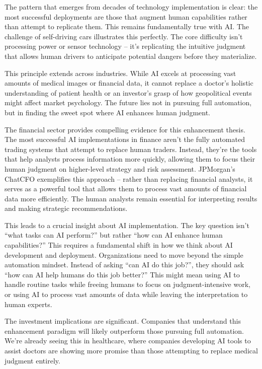 \documentclass[
  Letterpaper,
]{scrbook}
\begin{document}
The pattern that emerges from decades of technology implementation is
clear: the most successful deployments are those that augment human
capabilities rather than attempt to replicate them. This remains
fundamentally true with AI. The challenge of self-driving cars
illustrates this perfectly. The core difficulty isn't processing power
or sensor technology -- it's replicating the intuitive judgment that
allows human drivers to anticipate potential dangers before they
materialize.

This principle extends across industries. While AI excels at processing
vast amounts of medical images or financial data, it cannot replace a
doctor's holistic understanding of patient health or an investor's grasp
of how geopolitical events might affect market psychology. The future
lies not in pursuing full automation, but in finding the sweet spot
where AI enhances human judgment.

The financial sector provides compelling evidence for this enhancement
thesis. The most successful AI implementations in finance aren't the
fully automated trading systems that attempt to replace human traders.
Instead, they're the tools that help analysts process information more
quickly, allowing them to focus their human judgment on higher-level
strategy and risk assessment. JPMorgan's ChatCFO exemplifies this
approach -- rather than replacing financial analysts, it serves as a
powerful tool that allows them to process vast amounts of financial data
more efficiently. The human analysts remain essential for interpreting
results and making strategic recommendations.

This leads to a crucial insight about AI implementation. The key
question isn't ``what tasks can AI perform?'' but rather ``how can AI
enhance human capabilities?'' This requires a fundamental shift in how
we think about AI development and deployment. Organizations need to move
beyond the simple automation mindset. Instead of asking ``can AI do this
job?'', they should ask ``how can AI help humans do this job better?''
This might mean using AI to handle routine tasks while freeing humans to
focus on judgment-intensive work, or using AI to process vast amounts of
data while leaving the interpretation to human experts.

The investment implications are significant. Companies that understand
this enhancement paradigm will likely outperform those pursuing full
automation. We're already seeing this in healthcare, where companies
developing AI tools to assist doctors are showing more promise than
those attempting to replace medical judgment entirely.
\end{document}
